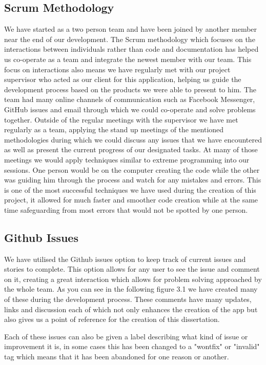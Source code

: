   \subsection{Scrum Methodology}
  We have started as a two person team and have been joined by another member near the end of our development. The Scrum methodology which focuses on the interactions between
  individuals rather than code and documentation has helped us co-operate as a team and integrate the newest member with our team.
  This focus on interactions also means we have regularly met with our project supervisor who acted as our client for this application, helping us guide the
  development process based on the products we were able to present to him.
  The team had many online channels of communication such as Facebook Messenger, GitHub issues and email through which we could co-operate and solve problems together.
  Outside of the regular meetings with the supervisor we have met regularly as a team, applying the stand up meetings of the mentioned methodologies during which
  we could discuss any issues that we have encountered as well as present the current progress of our designated tasks.
  At many of those meetings we would apply techniques similar to extreme programming into our sessions\cite{scrum}.
  One person would be on the computer creating the code while the other was guiding him through the process and watch for any mistakes and errors.
  This is one of the most successful techniques we have used during the creation of this project, it allowed for much faster and smoother code creation while
  at the same time safeguarding from most errors that would not be spotted by one person.

    \subsection{Github Issues}
    We have utilised the Github issues option to keep track of current issues and stories to complete. This option allows for any user to see the issue and comment on it, creating a great interaction which allows for problem solving approached by the whole team. As you can see in the following figure 3.1 we have created many of these during the development process. These comments have many updates, links and discussion each of which not only enhances the creation of the app but also gives us a point of reference for the creation of this dissertation.

    Each of these issues can also be given a label describing what kind of issue or improvement it is, in some cases this has been changed to a "wontfix" or "invalid" tag which means that it has been abandoned for one reason or another.


